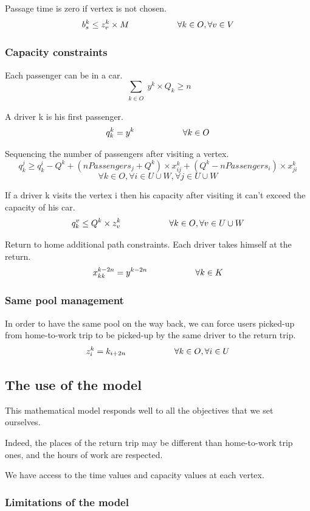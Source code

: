 \documentclass[12pt, a4paper, twoside]{memoir}
\newcommand\tab[1][1cm]{\hspace*{#1}}
\begin{document}
{	Passage time is zero if vertex is not chosen.
	\[ b^{k}_{s}\leq z^{k}_{v}\times M \tab \tab \forall k\in O, \forall v\in V \] 
	
	\subsubsection{Capacity constraints}
	
	Each passenger can be in a car. 
	\[ \sum_{\substack{k\in O}}y^{k}\times Q_{k}\geq n \] 
	
	A driver k is his first passenger.
	\[ q_{k}^{k}=y^{k}\tab \tab \forall k\in O \] 
	
	Sequencing the number of passengers after visiting a vertex.
	\[ q_{k}^{j}\ge q_{k}^{i}-Q^{k}+(nPassengers_{j}+Q^{k})\times x^{k}_{ij}+(Q^{k}-nPassengers_{i})\times x^{k}_{ji} \]
	\[ \forall k\in O, \forall i\in U\cup W, \forall j\in U\cup W\]
	
	If a driver k visits the vertex i then his capacity after visiting it can't exceed the capacity of his car.
	\[ q_{k}^{v}\le Q^{k}\times z^{k}_{v}\tab \tab \forall k\in O, \forall v\in U\cup W \] 
	
	Return to home additional path constraints.\newline
	Each driver takes himself at the return.
	\[ x^{k-2n}_{kk}=y^{k-2n} \tab \tab \forall k\in K \] 
	
	\subsubsection{Same pool management}
	
	In order to have the same pool on the way back, we can force users picked-up from home-to-work trip to be picked-up by the same driver to the return trip.
	\[ z^{k}_{i}={k}_{i+2n} \tab \tab \forall k\in O, \forall i\in U \] 

	\subsection{The use of the model}
	
	This mathematical model responds well to all the objectives that we set ourselves.

	Indeed, the places of the return trip may be different than home-to-work trip ones, and the hours of work are respected.
	
	We have access to the time values and capacity values at each vertex.
	
	\subsubsection{Limitations of the model}
	
}
\end{document}
